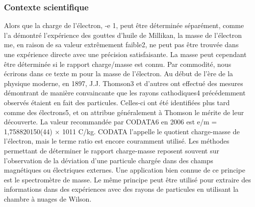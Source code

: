 \documentclass[../main.tex]{subfiles}
\begin{document}
\subsubsection{Contexte scientifique}
Alors que la charge de l'électron, -e 1, peut être déterminée séparément, comme l'a démontré l'expérience des gouttes d'huile de Millikan, la masse de l'électron me, en raison de sa valeur extrêmement faible2, ne peut pas être trouvée dans une expérience directe avec une précision satisfaisante. La masse peut cependant être déterminée si le rapport charge/masse est connu. Par commodité, nous écrirons dans ce texte m pour la masse de l'électron. Au début de l'ère de la physique moderne, en 1897, J.J. Thomson3 et d'autres ont effectué des mesures démontrant de manière convaincante que les rayons cathodiques4 précédemment observés étaient en fait des particules. Celles-ci ont été identifiées plus tard comme des électrons5, et on attribue généralement à Thomson le mérite de leur découverte. La valeur recommandée par CODATA6 en 2006 est e/m = 1,758820150(44) × 1011 C/kg. CODATA l'appelle le quotient charge-masse de l'électron, mais le terme ratio est encore couramment utilisé. Les méthodes permettant de déterminer le rapport charge-masse reposent souvent sur l'observation de la déviation d'une particule chargée dans des champs magnétiques ou électriques externes. Une application bien connue de ce principe est le spectromètre de masse. Le même principe peut être utilisé pour extraire des informations dans des expériences avec des rayons de particules en utilisant la chambre à nuages de Wilson.
\end{document}
